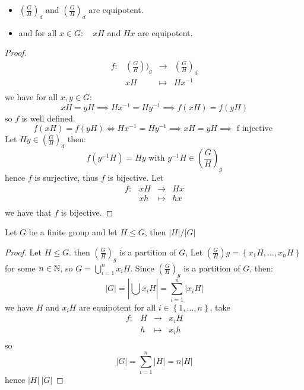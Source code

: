 \begin{proposition}[]
  \begin{itemize}
    \item 
$(\frac{G}{H}) _{d}$  and 
$\left( \frac{G}{H} \right) _{d} $  are equipotent.
\item  
and for all $x \in   G: \quad xH $  and 
$Hx $ are equipotent.
  \end{itemize}
\end{proposition}
\begin{proof}
\[
\begin{array}{cccc}
      f : &  (\frac{G}{H}) )_{g}  & \longrightarrow & 
      \left( \frac{G}{H} \right)_{d}\\

           &  xH  & \longmapsto     & Hx^{-1} \\ 
\end{array}
\]
we have for all $x,y \in  G$: 
\[
xH = yH \implies 
Hx^{-1} = Hy^{-1} \implies 
f(xH) = f(yH) 
\]
so $f $ is well defined.
\[
f(xH) = f(yH)  \iff 
Hx^{-1} = Hy^{-1} \implies 
xH = yH \implies \text{ f injective }  
\]
Let $Hy \in  \left( \frac{G}{H} \right) _{d} $ then:
\[
f(y^{-1}H)  = Hy \text{ with }  
y^{-1}H \in   
\left( \frac{G}{H} \right) _{g}
\]
hence $f $ is surjective, thus 
$f $ is bijective. Let 
\[
\begin{array}{cccc}
      f : &  xH  & \longrightarrow & Hx \\

           &  xh  & \longmapsto     & hx \\ 
\end{array}
\]
we have that $f $ is bijective.
\end{proof}
\begin{theorem}
Let $G $ be a finite group and let 
$H \leq G $, then $\left| H \right|  /  \left| G \right|   $ 
\end{theorem}
\begin{proof}
Let $H \leq G $. then $\left( \frac{G}{H} \right) _{g} $ is a partition 
of $G $, Let $\left( \frac{G}{H} \right) {g} = \left\{ x_1 H, \hdots , x_n H \right\} $ 
for some $n \in  \mathbb{N} $, so $G = \bigcup_{i=1}^{n} x_i H $. Since 
$\left( \frac{G}{H} \right) _{g} $ is a partition of $G $, then: 
\[
\left| G \right|   = 
\left| \bigcup_{}^{} x_{i}H \right|  = 
\sum_{i=1}^{n} \left| x_{i} H \right|  
\]
we have $H $ and $x_{i} H $ are equipotent for all $i \in   \left\{ 1, \hdots , n \right\} $, 
take 
\[
\begin{array}{cccc}
      f : &  H  & \longrightarrow &  x_{i} H\\

           &   h& \longmapsto     &  x_{i} h\\ 
\end{array}
\]
so 
\[
\left| G \right|   = \sum_{i=1}^{n} \left| H \right|  = n \left| H \right|  
\]
hence $\left| H \right|  \ \left| G \right|   $ 
\end{proof}

